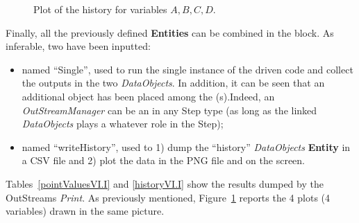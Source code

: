\begin{enumerate}
\begin{figure}[h!]
  \caption{Plot of the history for variables $A,B,C,D$.}
  \label{fig:historyPlotLine}
 \end{figure}
   Finally, all the previously defined \textbf{Entities} can be combined in the  block. As inferable, 
   two  have been inputted:
   \begin{itemize}
     \item {} named ``Single'', used to run the single instance of the driven code and collect 
     the outputs in the two \textit{DataObjects}. In addition, it can be seen that an additional object has been  
     placed among the (s).Indeed, an  \textit{OutStreamManager} can be an  in 
     any Step type (as long as the linked \textit{DataObjects} plays a whatever role in the Step);
     \item  {} named ``writeHistory'', used to 1) dump the ``history'' \textit{DataObjects} 
     \textbf{Entity} in a CSV file and 2) plot the data in the PNG file and on the screen.
   \end{itemize}
\end{enumerate} 
 Tables~\ref{pointValuesVI.I} and \ref{historyVI.I} show the results dumped by the OutStreams \textit{Print}.
 As previously mentioned, Figure~\ref{fig:historyPlotLine} reports the 4 plots (4 variables) drawn in the same picture. 
